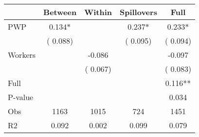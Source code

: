 
\begin{tabular}{l*{4}{c}}\hline&\multicolumn{1}{c}{Between}&\multicolumn{1}{c}{Within}&\multicolumn{1}{c}{Spillovers}&\multicolumn{1}{c}{Full}\\ \hline
 PWP           &              0.134*      &                                               &        0.237* &         0.233*                            \\ 
                               &        (       0.088)           &                                       &       (       0.095)     &      (       0.094)                                           \\ 
 Workers       &                                               &       -0.086    &                                &            -0.097                            \\ 
                               &                                               & (       0.067)                  &                                        &      (       0.083)                                           \\ 
\hline                                                                                                                                                                                                                                            
 Full                  &                                               &                                               &                                        &             0.116**                                     \\ 
 P-value               &                                               &                                               &                                        &             0.034                                           \\ 
 Obs                   &               1163               &       1015                       &       724                &              1451                                               \\ 
 R2                    &                      0.092              &              0.002                      &              0.099               &                     0.079                                              \\ 
\hline \end{tabular}                                                                                                                                                                                                              